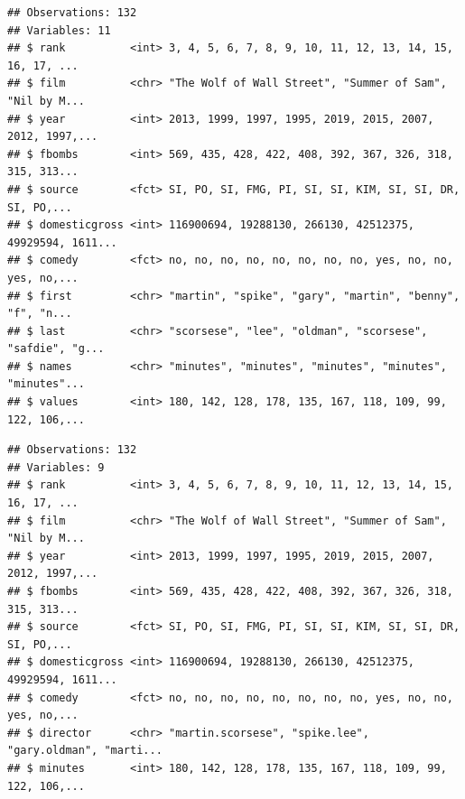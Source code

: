 \documentclass[]{article}
\newenvironment{Shaded}{\begin{snugshade}}{\end{snugshade}}
\newcommand{\DataTypeTok}[1]{\textcolor[rgb]{0.13,0.29,0.53}{#1}}
\newcommand{\KeywordTok}[1]{\textcolor[rgb]{0.13,0.29,0.53}{\textbf{#1}}}
\newcommand{\NormalTok}[1]{#1}
\newcommand{\OperatorTok}[1]{\textcolor[rgb]{0.81,0.36,0.00}{\textbf{#1}}}
\newcommand{\StringTok}[1]{\textcolor[rgb]{0.31,0.60,0.02}{#1}}
\begin{document}
\begin{verbatim}
## Observations: 132
## Variables: 11
## $ rank          <int> 3, 4, 5, 6, 7, 8, 9, 10, 11, 12, 13, 14, 15, 16, 17, ...
## $ film          <chr> "The Wolf of Wall Street", "Summer of Sam", "Nil by M...
## $ year          <int> 2013, 1999, 1997, 1995, 2019, 2015, 2007, 2012, 1997,...
## $ fbombs        <int> 569, 435, 428, 422, 408, 392, 367, 326, 318, 315, 313...
## $ source        <fct> SI, PO, SI, FMG, PI, SI, SI, KIM, SI, SI, DR, SI, PO,...
## $ domesticgross <int> 116900694, 19288130, 266130, 42512375, 49929594, 1611...
## $ comedy        <fct> no, no, no, no, no, no, no, no, yes, no, no, yes, no,...
## $ first         <chr> "martin", "spike", "gary", "martin", "benny", "f", "n...
## $ last          <chr> "scorsese", "lee", "oldman", "scorsese", "safdie", "g...
## $ names         <chr> "minutes", "minutes", "minutes", "minutes", "minutes"...
## $ values        <int> 180, 142, 128, 178, 135, 167, 118, 109, 99, 122, 106,...
\end{verbatim}

\begin{Shaded}
\end{Shaded}

\begin{verbatim}
## Observations: 132
## Variables: 9
## $ rank          <int> 3, 4, 5, 6, 7, 8, 9, 10, 11, 12, 13, 14, 15, 16, 17, ...
## $ film          <chr> "The Wolf of Wall Street", "Summer of Sam", "Nil by M...
## $ year          <int> 2013, 1999, 1997, 1995, 2019, 2015, 2007, 2012, 1997,...
## $ fbombs        <int> 569, 435, 428, 422, 408, 392, 367, 326, 318, 315, 313...
## $ source        <fct> SI, PO, SI, FMG, PI, SI, SI, KIM, SI, SI, DR, SI, PO,...
## $ domesticgross <int> 116900694, 19288130, 266130, 42512375, 49929594, 1611...
## $ comedy        <fct> no, no, no, no, no, no, no, no, yes, no, no, yes, no,...
## $ director      <chr> "martin.scorsese", "spike.lee", "gary.oldman", "marti...
## $ minutes       <int> 180, 142, 128, 178, 135, 167, 118, 109, 99, 122, 106,...
\end{verbatim}
\end{document}
